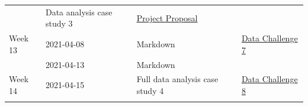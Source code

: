\documentclass[
]{book}
\begin{document}
\begin{longtable}[]{@{}llll@{}}
\begin{minipage}[t]{0.22\columnwidth}
\end{minipage} & \begin{minipage}[t]{0.22\columnwidth}\raggedright
Data analysis case study 3\strut
\end{minipage} & \begin{minipage}[t]{0.22\columnwidth}\raggedright
\href{final_project_docs/esoc214_project_proposal.pdf}{Project Proposal}\strut
\end{minipage}\tabularnewline
\begin{minipage}[t]{0.22\columnwidth}\raggedright
Week 13\strut
\end{minipage} & \begin{minipage}[t]{0.22\columnwidth}\raggedright
2021-04-08\strut
\end{minipage} & \begin{minipage}[t]{0.22\columnwidth}\raggedright
Markdown\strut
\end{minipage} & \begin{minipage}[t]{0.22\columnwidth}\raggedright
\href{}{Data Challenge 7}\strut
\end{minipage}\tabularnewline
\begin{minipage}[t]{0.22\columnwidth}\raggedright
\strut
\end{minipage} & \begin{minipage}[t]{0.22\columnwidth}\raggedright
2021-04-13\strut
\end{minipage} & \begin{minipage}[t]{0.22\columnwidth}\raggedright
Markdown\strut
\end{minipage} & \begin{minipage}[t]{0.22\columnwidth}\raggedright
\strut
\end{minipage}\tabularnewline
\begin{minipage}[t]{0.22\columnwidth}\raggedright
Week 14\strut
\end{minipage} & \begin{minipage}[t]{0.22\columnwidth}\raggedright
2021-04-15\strut
\end{minipage} & \begin{minipage}[t]{0.22\columnwidth}\raggedright
Full data analysis case study 4\strut
\end{minipage} & \begin{minipage}[t]{0.22\columnwidth}\raggedright
\href{}{Data Challenge 8}\strut
\end{minipage}\tabularnewline
\begin{minipage}[t]{0.22\columnwidth}\raggedright
\strut

\end{minipage}
\end{longtable}
\end{document}
